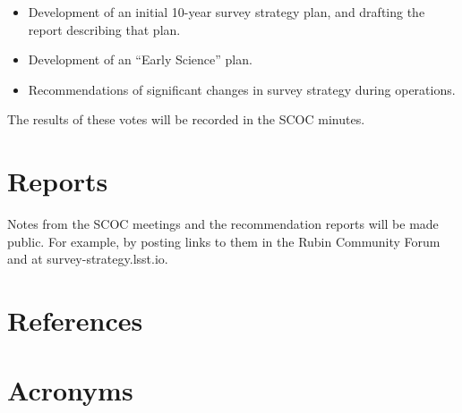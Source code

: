 \documentclass[OPS,lsstdraft,authoryear,toc]{lsstdoc}
\begin{document}
\begin{itemize}
\item Development of an initial 10-year survey strategy plan, and drafting the report describing that plan.
\item Development of an “Early Science” plan.
\item Recommendations of significant changes in survey strategy during operations.
\end{itemize}

The results of these votes will be recorded in the SCOC minutes.


\section{Reports}

Notes from the SCOC meetings and the recommendation reports will be made public.
For example, by posting links to them in the Rubin Community Forum and at survey-strategy.lsst.io.



\appendix
\section{References} \label{sec:bib}
\renewcommand{\refname}{} %


\section{Acronyms} \label{sec:acronyms}

\end{document}
